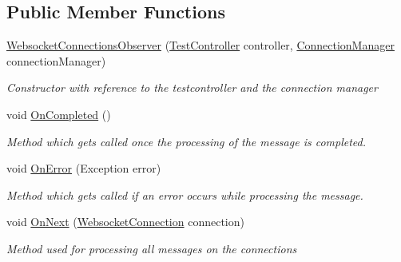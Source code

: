 \subsection*{Public Member Functions}
\begin{DoxyCompactItemize}
\item 
\hyperlink{class_web_analyzer_1_1_server_1_1_websocket_connections_observer_ab58aac7b482c3830fe3b6011f5817252}{Websocket\+Connections\+Observer} (\hyperlink{class_web_analyzer_1_1_controller_1_1_test_controller}{Test\+Controller} controller, \hyperlink{class_web_analyzer_1_1_server_1_1_connection_manager}{Connection\+Manager} connection\+Manager)
\begin{DoxyCompactList}\small\item\em Constructor with reference to the testcontroller and the connection manager \end{DoxyCompactList}\item 
void \hyperlink{class_web_analyzer_1_1_server_1_1_websocket_connections_observer_ab390b748581070364777bb40976fd5f5}{On\+Completed} ()
\begin{DoxyCompactList}\small\item\em Method which gets called once the processing of the message is completed. \end{DoxyCompactList}\item 
void \hyperlink{class_web_analyzer_1_1_server_1_1_websocket_connections_observer_a5db5060833e71e8f9e33beedcf3ed353}{On\+Error} (Exception error)
\begin{DoxyCompactList}\small\item\em Method which gets called if an error occurs while processing the message. \end{DoxyCompactList}\item 
void \hyperlink{class_web_analyzer_1_1_server_1_1_websocket_connections_observer_a029ee7e7c62cb440b9a3fce8a0d041ba}{On\+Next} (\hyperlink{class_web_analyzer_1_1_server_1_1_websocket_connection}{Websocket\+Connection} connection)
\begin{DoxyCompactList}\small\item\em Method used for processing all messages on the connections \end{DoxyCompactList}\end{DoxyCompactItemize}
